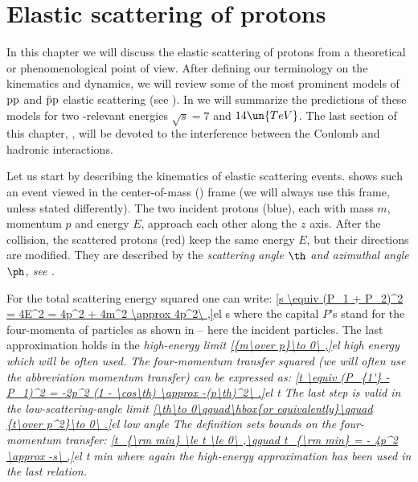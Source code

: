 \def\FC{F^{\rm C}}
\def\FH{F^{\rm H}}
\def\FCH{F^{\rm C+H}}

\def\KL{Kundr\' at-Lokaj\char237\char232 ek}
\def\KaL{Kundr\' at and Lokaj\char237\char232 ek}
\def\WY{West-Yennie}
\def\WaY{West and Yennie}

\def\formula#1{%
	$$\hbox to\hsize{\hskip1cm\it #1\hss}$$
	\vskip-5mm
}


\chapter[el]{Elastic scattering of protons}

In this chapter we will discuss the elastic scattering of protons from a theoretical or phenomenological point of view. After defining our terminology on the kinematics and dynamics, we will review some of the most prominent models of $\rm pp$ and $\rm\bar pp$ elastic scattering (see ). In  we will summarize the predictions of these models for two -relevant energies $\sqrt s = 7$ and $14\un{TeV}$. The last section of this chapter, , will be devoted to the interference between the Coulomb and hadronic interactions.

Let us start by describing the kinematics of elastic scattering events.  shows such an event viewed in the center-of-mass () frame (we will always use this frame, unless stated differently). The two incident protons (blue), each with mass $m$, momentum $p$ and energy $E$, approach each other along the $z$ axis. After the collision, the scattered protons (red) keep the same energy $E$, but their directions are modified. They are described by the \em{scattering angle} $\th$ and \em{azimuthal angle} $\ph$, see .


For the total scattering energy squared one can write:
\eqref{s \equiv (P_1 + P_2)^2 = 4E^2 = 4p^2 + 4m^2 \approx 4p^2\ ,}{el s}
where the capital $P$'s stand for the four-momenta of particles as shown in  -- here the incident particles. The last approximation holds in the \em{high-energy} limit
\eqref{{m\over p}\to 0\ ,}{el high energy}
which will be often used. The four-momentum transfer squared (we will often use the abbreviation momentum transfer) can be expressed as:
\eqref{t \equiv (P_{1'} - P_1)^2 = -2p^2 (1 - \cos\th) \approx -(p\th)^2\ .}{el t}
The last step is valid in the \em{low-scattering-angle} limit
\eqref{\th\to 0\qquad\hbox{or equivalently}\qquad {t\over p^2}\to 0\ .}{el low angle}
The definition  sets bounds on the four-momentum transfer:
\eqref{t_{\rm min} \le t \le 0\ ,\qquad t_{\rm min} = - 4p^2 \approx -s\ ,}{el t min}
where again the high-energy approximation has been used in the last relation.

